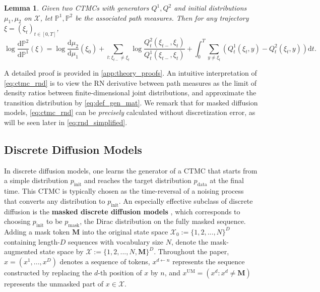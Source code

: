 \documentclass{article}
\newtheorem{lemma}{Lemma}
\theoremstyle{remark}
\renewcommand{\P}{\mathbb{P}}
\renewcommand{\d}{\mathrm{d}}
\newcommand{\de}[2]{\frac{\mathrm{d}#1}{\mathrm{d}#2}} %
\newcommand{\cX}{\mathcal{X}}
\newcommand{\pinit}{p_\mathrm{init}}
\newcommand{\pdata}{p_\mathrm{data}}
\newcommand{\pmask}{p_\mathrm{mask}}
\newcommand{\um}{\mathrm{UM}} %
\newcommand{\mask}{\mathbf{M}}
\begin{document}
\begin{lemma}
\label{lem:rnd}
    Given two CTMCs with generators $Q^1,Q^2$ and initial distributions $\mu_1,\mu_2$ on $\cX$, let $\P^1,\P^2$ be the associated path measures. Then for any trajectory $\xi=(\xi_t)_{t\in[0,T]}$,
    \begin{equation}
        \log\de{\P^2}{\P^1}(\xi)=\log\de{\mu_2}{\mu_1}(\xi_0)+\sum_{t:\xi_{t-}\ne\xi_t}\log\frac{Q^2_t(\xi_{t-},\xi_t)}{Q^1_t(\xi_{t-},\xi_t)}+\int_0^T\sum_{y\ne\xi_t}(Q^1_t(\xi_t,y)-Q^2_t(\xi_t,y))\d t.
        \label{eq:ctmc_rnd}        
    \end{equation}
    \label{lem:ctmc_rnd}
\end{lemma}
A detailed proof is provided in \cref{app:theory_proofs}. An intuitive interpretation of \cref{eq:ctmc_rnd} is to view the RN derivative between path measures as the limit of density ratios between finite-dimensional joint distributions, and approximate the transition distribution by \cref{eq:def_gen_mat}. We remark that for masked diffusion models, \cref{eq:ctmc_rnd} can be \textit{precisely} calculated without discretization error, as will be seen later in \cref{eq:rnd_simplified}. %

\subsection{Discrete Diffusion Models}
\label{sec:prelim_mask}
%
%
%
In discrete diffusion models, one learns the generator of a CTMC that starts from a simple distribution $\pinit$ and reaches the target distribution $\pdata$ at the final time. This CTMC is typically chosen as the time-reversal of a noising process that converts any distribution to $\pinit$.
%
An especially effective subclass of discrete diffusion is the \textbf{masked discrete diffusion models} \cite{lou2024discrete,ou2025your,sahoo2024simple,shi2024simplified,zheng2025masked}, which corresponds to choosing $\pinit$ to be $\pmask$, the Dirac distribution on the fully masked sequence. Adding a mask token $\mask$ into the original state space $\cX_0:= \{1,2,...,N\}^D$ containing length-$D$ sequences with vocabulary size $N$, denote the mask-augmented state space by $\cX:=\{1,2,...,N,\mask\}^D$. Throughout the paper, $x=(x^1,...,x^D)$ denotes a sequence of tokens, $x^{d\gets n}$ represents the sequence constructed by replacing the $d$-th position of $x$ by $n$, and $x^\um=(x^d:x^d\ne\mask)$ represents the unmasked part of $x\in\cX$.
\end{document}
